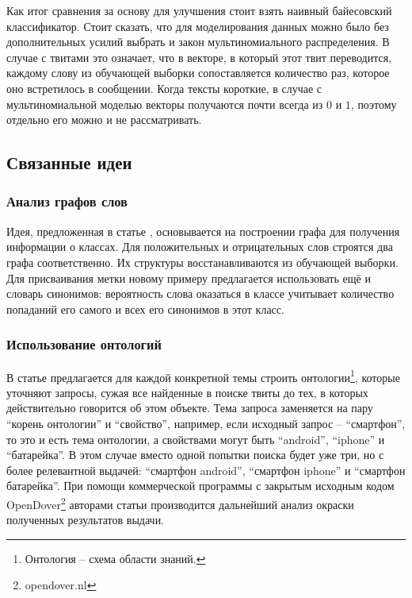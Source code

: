 Как итог сравнения за основу для улучшения стоит взять наивный байесовский классификатор. Стоит
сказать, что для моделирования данных можно было без дополнительных усилий выбрать
и закон мультиномиального распределения. В случае с твитами это означает, что в векторе, в который этот твит
переводится, каждому слову из обучающей выборки сопоставляется количество раз, которое оно встретилось в сообщении. Когда тексты короткие, в случае с мультиномиальной моделью векторы
получаются почти всегда из $0$ и $1$, поэтому отдельно его можно и не рассматривать.

\subsection{Связанные идеи}

\subsubsection{Анализ графов слов}
Идея, предложенная в статье \cite{Colace2013}, основывается на построении графа для получения
информации о классах. Для положительных и отрицательных слов строятся два графа
соответственно. Их структуры восстанавливаются из обучающей выборки. Для присваивания метки новому
примеру предлагается использовать ещё и словарь синонимов: вероятность слова оказаться в классе учитывает количество
попаданий его самого и всех его синонимов в этот класс.

\subsubsection{Использование онтологий}
В статье \cite{Kontopoulos2013} предлагается для каждой конкретной темы строить
онтологии\footnote{Онтология -- схема области знаний.}, которые уточняют запросы, сужая все
найденные в поиске твиты до тех, в которых действительно говорится об этом объекте. Тема запроса заменяется на пару ``корень
онтологии'' и ``свойство'', например, если исходный запрос -- ``смартфон'', то
это и есть тема
онтологии, а свойствами могут быть ``android'', ``iphone'' и ``батарейка''. В этом случае вместо
одной попытки поиска будет уже три, но с более релевантной выдачей: ``смартфон android'', ``смартфон iphone'' и ``смартфон
батарейка''. При помощи коммерческой программы с закрытым исходным кодом
OpenDover\footnote{opendover.nl} авторами статьи производится дальнейший анализ окраски полученных результатов
выдачи.

